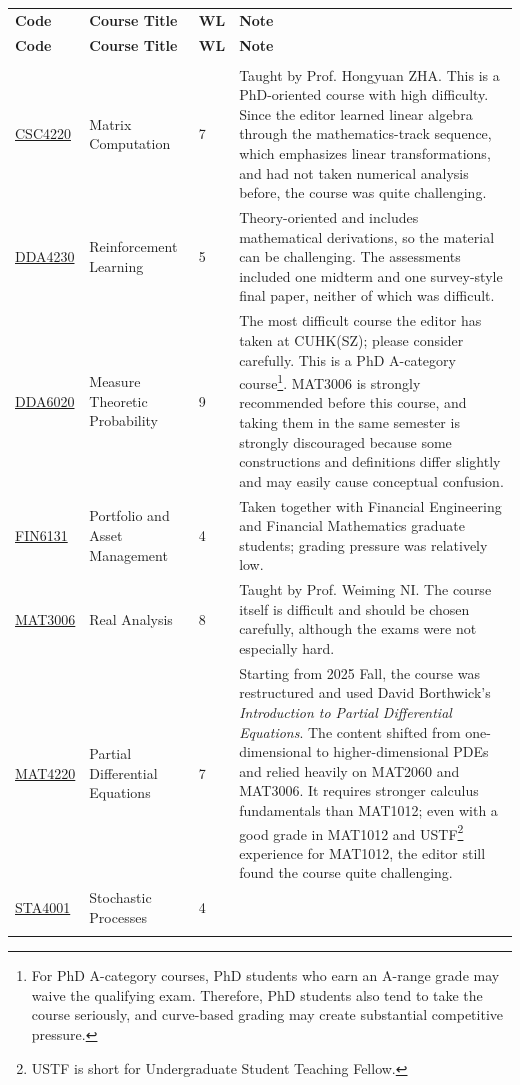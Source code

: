 \documentclass[11pt,fontset=fandol]{ctexart}
\newcommand{\MathStatCode}[1]{\colorbox{mathstatblue}{#1}}
\newcommand{\CSDSCode}[1]{\colorbox{csdsred}{#1}}
\newcommand{\FinEconCode}[1]{\colorbox{finecongreen}{#1}}
\newcommand{\SyllabusBase}{https://github.com/vfziry/Course-Review/blob/main/syllabus}
\newcommand{\CourseCode}[2]{\href{\SyllabusBase/#1}{#2}}
\newcommand{\lighthline}{\arrayrulecolor{black!10}\hline\arrayrulecolor{black}}
\newcommand{\midhline}{\arrayrulecolor{black!50}\hline\arrayrulecolor{black}}
\newcounter{EditorCodeFootnote}
\newcounter{EditorWLFootnote}
\newcounter{EditorNoteFootnote}
\newcounter{PhDACategoryFootnote}
\newenvironment{EditorCourseTable}{%
\begin{longtable}{C{1.8cm}L{6.2cm}C{0.7cm}N{7.4cm}}
\hline
\textbf{Code\footnotemark[\value{EditorCodeFootnote}]} & \textbf{Course Title} & \textbf{WL\footnotemark[\value{EditorWLFootnote}]} & {\normalsize\textbf{Note\footnotemark[\value{EditorNoteFootnote}]}}\\
\midhline
\endfirsthead
\hline
\textbf{Code} & \textbf{Course Title} & \textbf{WL} & {\normalsize\textbf{Note}}\\
\midhline
\endhead
\hline
\endfoot
}{%
\end{longtable}
}
\begin{document}
\begin{EditorCourseTable}
\\ \lighthline
\MathStatCode{\CourseCode{CSC4220_v_001_250612.pdf}{CSC4220}} & Matrix Computation & 7 & Taught by Prof. Hongyuan ZHA. This is a PhD-oriented course with high difficulty. Since the editor learned linear algebra through the mathematics-track sequence, which emphasizes linear transformations, and had not taken numerical analysis before, the course was quite challenging.\\
\CSDSCode{\CourseCode{DDA4230_v_004_250721.pdf}{DDA4230}} & Reinforcement Learning & 5 & Theory-oriented and includes mathematical derivations, so the material can be challenging. The assessments included one midterm and one survey-style final paper, neither of which was difficult.\\
\MathStatCode{\CourseCode{DDA6020_v_001_250813.pdf}{DDA6020}} & Measure Theoretic Probability & 9 & The most difficult course the editor has taken at CUHK(SZ); please consider carefully. This is a PhD A-category course\footnote{For PhD A-category courses, PhD students who earn an A-range grade may waive the qualifying exam. Therefore, PhD students also tend to take the course seriously, and curve-based grading may create substantial competitive pressure.}\setcounter{PhDACategoryFootnote}{\value{footnote}}. MAT3006 is strongly recommended before this course, and taking them in the same semester is strongly discouraged because some constructions and definitions differ slightly and may easily cause conceptual confusion.\\
\FinEconCode{\CourseCode{FIN6131_v_001_250722.pdf}{FIN6131}} & Portfolio and Asset Management & 4 & Taken together with Financial Engineering and Financial Mathematics graduate students; grading pressure was relatively low.\\
\MathStatCode{\CourseCode{MAT3006_v_004_250808.pdf}{MAT3006}} & Real Analysis & 8 & Taught by Prof. Weiming NI. The course itself is difficult and should be chosen carefully, although the exams were not especially hard. \\
\MathStatCode{\CourseCode{MAT4220_v_003_240812.pdf}{MAT4220}} & Partial Differential Equations & 7 & Starting from 2025 Fall, the course was restructured and used David Borthwick's \textit{Introduction to Partial Differential Equations}. The content shifted from one-dimensional to higher-dimensional PDEs and relied heavily on MAT2060 and MAT3006. It requires stronger calculus fundamentals than MAT1012; even with a good grade in MAT1012 and USTF\footnote{USTF is short for Undergraduate Student Teaching Fellow.} experience for MAT1012, the editor still found the course quite challenging.\\
\MathStatCode{\CourseCode{STA4001_v_007_250721.pdf}{STA4001}} & Stochastic Processes & 4 & \\ \midhline


\end{EditorCourseTable}
\end{document}
